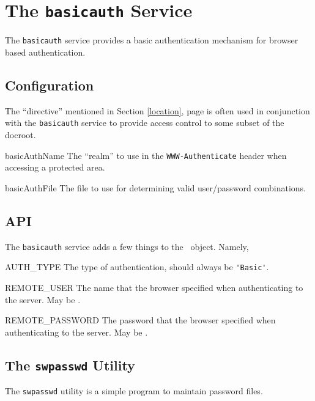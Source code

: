 \documentclass{manual}
\begin{document}
\chapter{The \texttt{basicauth} Service}

The \texttt{basicauth} service provides a basic authentication
mechanism for browser based authentication.

\section{Configuration}

The \Location{} ``directive'' mentioned in Section \ref{location},
page \pageref{location} is often used in conjunction with the
\texttt{basicauth} service to provide access control to some subset of
the docroot.

\begin{datadesc}{basicAuthName} The ``realm'' to use in the
\verb!WWW-Authenticate! header when accessing a protected area.
\end{datadesc}
\begin{datadesc}{basicAuthFile} The file to use for determining valid
user/password combinations.
\end{datadesc}


\section{API}
The \texttt{basicauth} service adds a few things to the
\connection\ object.  Namely,
\begin{memberdesc}[string]{AUTH_TYPE} The type of authentication,
should always be \verb!'Basic'!.
\end{memberdesc}
\begin{memberdesc}[string]{REMOTE_USER} The name that the browser
specified when authenticating to the server.  May be \None.
\end{memberdesc}
\begin{memberdesc}[string]{REMOTE_PASSWORD} The password that the browser
specified when authenticating to the server.  May be \None.
\end{memberdesc}

\section{The \texttt{swpasswd} Utility}
The \texttt{swpasswd} utility is a simple program to maintain
password files.  
\end{document}
